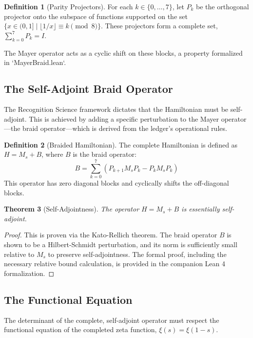 \documentclass[11pt,a4paper]{article}
\newtheorem{theorem}{Theorem}[section]
\theoremstyle{definition}
\newtheorem{definition}[theorem]{Definition}
\theoremstyle{remark}
\begin{document}
\begin{definition}[Parity Projectors]
For each $k \in \{0, \dots, 7\}$, let $P_k$ be the orthogonal projector onto the subspace of functions supported on the set $\{x \in (0,1] \mid \lfloor 1/x \rfloor \equiv k \pmod 8 \}$. These projectors form a complete set, $\sum_{k=0}^7 P_k = I$.
\end{definition}

The Mayer operator acts as a cyclic shift on these blocks, a property formalized in `MayerBraid.lean`.

\subsection{The Self-Adjoint Braid Operator}

The Recognition Science framework dictates that the Hamiltonian must be self-adjoint. This is achieved by adding a specific perturbation to the Mayer operator—the braid operator—which is derived from the ledger's operational rules.

\begin{definition}[Braided Hamiltonian]
The complete Hamiltonian is defined as $H = M_s + B$, where $B$ is the braid operator:
\[
   B = \sum_{k=0}^7 \left( P_{k+1} M_s P_k - P_k M_s P_k \right)
\]
This operator has zero diagonal blocks and cyclically shifts the off-diagonal blocks.
\end{definition}

\begin{theorem}[Self-Adjointness]
The operator $H = M_s + B$ is essentially self-adjoint.
\end{theorem}
\begin{proof}
This is proven via the Kato-Rellich theorem. The braid operator $B$ is shown to be a Hilbert-Schmidt perturbation, and its norm is sufficiently small relative to $M_s$ to preserve self-adjointness. The formal proof, including the necessary relative bound calculation, is provided in the companion Lean 4 formalization.
\end{proof}

\subsection{The Functional Equation}

The determinant of the complete, self-adjoint operator must respect the functional equation of the completed zeta function, $\xi(s) = \xi(1-s)$.
\end{document}
